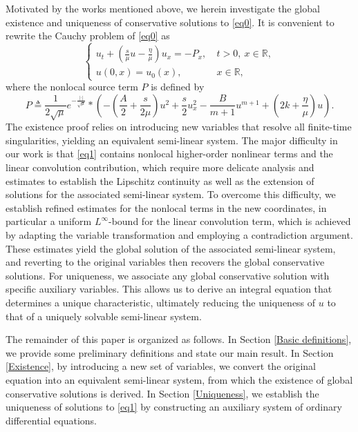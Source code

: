 \documentclass[10pt]{article}
\numberwithin{equation}{section}
\begin{document}
	Motivated by the works mentioned above, we herein investigate the global existence and uniqueness of conservative solutions to \eqref{eq0}. It is convenient to rewrite the Cauchy problem of \eqref{eq0} as
	\begin{equation}\label{eq1}
		\left\{
		\begin{array}{ll}
			u_t+\left(\frac{s}{\mu}u-\frac{\eta}{\mu}\right)u_x
			=-P_x,\ &t>0,\ x\in\mathbb{R}, \\
			u(0,x)=u_0(x), &x\in\mathbb{R},
		\end{array}\right.
	\end{equation}
	where the nonlocal source term $P$ is defined by
	\begin{equation}
		P\triangleq \frac{1}{2\sqrt{\mu}}e^{-\frac{|\cdot|}{\sqrt{\mu}}}*\left(-\left(\frac{A}{2}+\frac{s}{2\mu}\right)u^2+\frac{s}{2}u_x^2-\frac{B}{m+1}u^{m+1}+\left(2k+\frac{\eta}{\mu}\right)u\right).
	\end{equation}
	The existence proof relies on introducing new variables that resolve all finite-time singularities, yielding an equivalent semi-linear system. The major difficulty in our work is that \eqref{eq1} contains nonlocal higher-order nonlinear terms and the linear convolution contribution, which require more delicate analysis and estimates to establish the Lipschitz continuity as well as the extension of solutions for the associated semi-linear system. To overcome this difficulty, we establish refined estimates for the nonlocal terms in the new coordinates, in particular a uniform $L^\infty$-bound for the linear convolution term, which is achieved by adapting the variable transformation and employing a contradiction argument. These estimates yield the global solution of the associated semi-linear system, and reverting to the original variables then recovers the global conservative solutions. For uniqueness, we associate any global conservative solution with specific auxiliary variables. This allows us to derive an integral equation that determines a unique characteristic, ultimately reducing the uniqueness of $u$ to that of a uniquely solvable semi-linear system.
	
	The remainder of this paper is organized as follows. In Section \ref{Basic definitions}, we provide some preliminary definitions and state our main result. In Section \ref{Existence}, by introducing a new set of variables, we convert the original equation into an equivalent semi-linear system, from which the existence of global conservative solutions is derived. In Section \ref{Uniqueness}, we establish the uniqueness of solutions to \eqref{eq1} by constructing an auxiliary system of ordinary differential equations.
	
\end{document}
